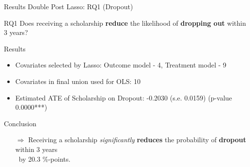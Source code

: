 \documentclass[aspectratio=169]{beamer}
\begin{document}
\begin{frame}{Results Double Post Lasso: RQ1 (Dropout)}
\hypertarget{main-slide}{}
\vspace{20pt}
    \begin{alertblock}{RQ1}
	Does receiving a scholarship \textbf{reduce} the likelihood of \textbf{dropping out} within 3 years?
	\end{alertblock}

\begin{block}{Results}
\begin{itemize}[label=--,itemsep=1pt,topsep=2pt]
	\item Covariates selected by Lasso: Outcome model - 4, Treatment model - 9
	\item Covariates in final union used for OLS: 10
	\item Estimated ATE of Scholarship on Dropout: -0.2030 (s.e. 0.0159) (p-value 0.0000***)
\end{itemize}
\end{block}

\begin{exampleblock}{Conclusion}
\vspace{-3pt}
\begin{itemize}
	\item [$\Rightarrow$]Receiving a scholarship \textit{significantly} \textbf{reduces} the probability of \textbf{dropout} within 3 years \\ by 20.3 \%-points. 
\end{itemize}
\vspace{-3pt}
\end{exampleblock}
\raggedleft
\hyperlink{appendix-slide}{}
\end{frame}
\end{document}
